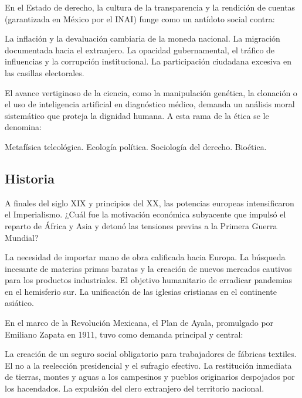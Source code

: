 \documentclass[12pt]{evaluasep}
\begin{document}
\begin{questions}
    \question En el Estado de derecho, la cultura de la transparencia y la rendición de cuentas (garantizada en México por el INAI) funge como un antídoto social contra:
    \begin{choices}
        \choice La inflación y la devaluación cambiaria de la moneda nacional.
        \choice La migración documentada hacia el extranjero.
        \CorrectChoice La opacidad gubernamental, el tráfico de influencias y la corrupción institucional.
        \choice La participación ciudadana excesiva en las casillas electorales.
    \end{choices}

    \question El avance vertiginoso de la ciencia, como la manipulación genética, la clonación o el uso de inteligencia artificial en diagnóstico médico, demanda un análisis moral sistemático que proteja la dignidad humana. A esta rama de la ética se le denomina:
    \begin{choices}
        \choice Metafísica teleológica.
        \choice Ecología política.
        \choice Sociología del derecho.
        \CorrectChoice Bioética.
    \end{choices}

    \subsection{Historia}

\question A finales del siglo XIX y principios del XX, las potencias europeas intensificaron el Imperialismo. ¿Cuál fue la motivación económica subyacente que impulsó el reparto de África y Asia y detonó las tensiones previas a la Primera Guerra Mundial?
    \begin{choices}
        \choice La necesidad de importar mano de obra calificada hacia Europa.
        \CorrectChoice La búsqueda incesante de materias primas baratas y la creación de nuevos mercados cautivos para los productos industriales.
        \choice El objetivo humanitario de erradicar pandemias en el hemisferio sur.
        \choice La unificación de las iglesias cristianas en el continente asiático.
    \end{choices}

    \question En el marco de la Revolución Mexicana, el Plan de Ayala, promulgado por Emiliano Zapata en 1911, tuvo como demanda principal y central:
    \begin{choices}
        \choice La creación de un seguro social obligatorio para trabajadores de fábricas textiles.
        \choice El no a la reelección presidencial y el sufragio efectivo.
        \CorrectChoice La restitución inmediata de tierras, montes y aguas a los campesinos y pueblos originarios despojados por los hacendados.
        \choice La expulsión del clero extranjero del territorio nacional.
    \end{choices}


\end{questions}
\end{document}
